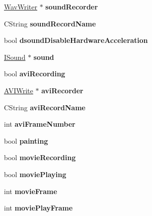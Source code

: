 \begin{DoxyCompactItemize}
\mbox{\hyperlink{class_wav_writer}{Wav\+Writer}} $\ast$ {\bfseries sound\+Recorder}
\item 
\mbox{\label{class_v_b_a_a11f02b69eef7e9b876a2f93d6c2f015e}} 
C\+String {\bfseries sound\+Record\+Name}
\item 
\mbox{\label{class_v_b_a_a58f89c52283d10a0fcaac8abb7eca524}} 
bool {\bfseries dsound\+Disable\+Hardware\+Acceleration}
\item 
\mbox{\label{class_v_b_a_ac6befecbeb59eb76556d3d7490e0452c}} 
\mbox{\hyperlink{class_i_sound}{I\+Sound}} $\ast$ {\bfseries sound}
\item 
\mbox{\label{class_v_b_a_a96743b6c6ee2d9b45c52b981136e3738}} 
bool {\bfseries avi\+Recording}
\item 
\mbox{\label{class_v_b_a_a761be1e36182d12710a199a50c0df020}} 
\mbox{\hyperlink{class_a_v_i_write}{A\+V\+I\+Write}} $\ast$ {\bfseries avi\+Recorder}
\item 
\mbox{\label{class_v_b_a_a62ff0f88b2380de18a1412783c8d9959}} 
C\+String {\bfseries avi\+Record\+Name}
\item 
\mbox{\label{class_v_b_a_a3b3857d94f1df7cf3b722ad494547324}} 
int {\bfseries avi\+Frame\+Number}
\item 
\mbox{\label{class_v_b_a_acf5db3724f3961d0c7b7a48b1682ab09}} 
bool {\bfseries painting}
\item 
\mbox{\label{class_v_b_a_a7fbf39fb4604c00c8ad139b2e27f3756}} 
bool {\bfseries movie\+Recording}
\item 
\mbox{\label{class_v_b_a_ac490c27ebc24ea8fbccf42e2909d04ed}} 
bool {\bfseries movie\+Playing}
\item 
\mbox{\label{class_v_b_a_ae1d2d002a3d425b509b93171e8ade926}} 
int {\bfseries movie\+Frame}
\item 
\mbox{\label{class_v_b_a_afcffae74eebd4424790f8c48faede1c8}} 
int {\bfseries movie\+Play\+Frame}

\end{DoxyCompactItemize}
